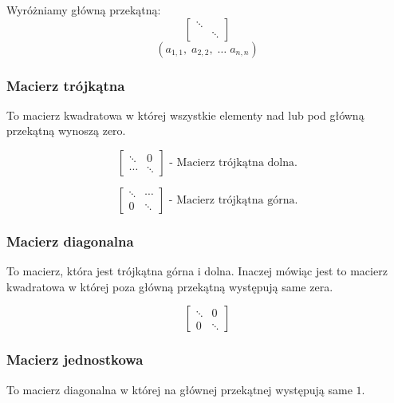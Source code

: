 \documentclass[../Matematyka.tex]{subfiles}
\begin{document}
    Wyróżniamy główną przekątną:
    \begin{displaymath}
        \begin{bmatrix}
            \ddots & \\
            & \ddots
        \end{bmatrix}
    \end{displaymath}
    \[(a_{1,1}, \; a_{2,2}, \;\dots\; a_{n,n})\]

    \subsubsection{Macierz trójkątna}
    To macierz kwadratowa w której wszystkie elementy nad lub pod główną przekątną wynoszą zero.

    \begin{displaymath}
        \begin{bmatrix}
            \ddots &  0 \\
            \cdots & \ddots
        \end{bmatrix}
        \text{ - Macierz trójkątna dolna.}
    \end{displaymath}

    \begin{displaymath}
        \begin{bmatrix}
            \ddots & \cdots \\
            0 & \ddots
        \end{bmatrix}
        \text{ - Macierz trójkątna górna.}
    \end{displaymath}

    \subsubsection{Macierz diagonalna}
    To macierz, która jest trójkątna górna i dolna.
    Inaczej mówiąc jest to macierz kwadratowa w której poza główną przekątną występują same zera.

    \begin{displaymath}
        \begin{bmatrix}
            \ddots & 0 \\
            0 & \ddots
        \end{bmatrix}
    \end{displaymath}

    \subsubsection{Macierz jednostkowa}
    To macierz diagonalna w której na głównej przekątnej występują same \(1\).
\end{document}
